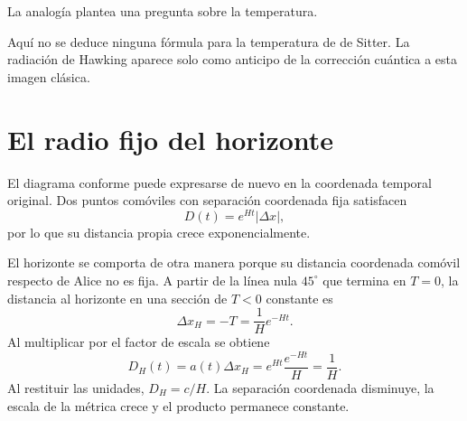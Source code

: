 La analogía plantea una pregunta sobre la temperatura.

\begin{classroomqa}
\end{classroomqa}

Aquí no se deduce ninguna fórmula para la temperatura de de Sitter. La radiación de Hawking aparece solo como anticipo de la corrección cuántica a esta imagen clásica.

\section{El radio fijo del horizonte}

El diagrama conforme puede expresarse de nuevo en la coordenada temporal original. Dos puntos comóviles con separación coordenada fija satisfacen
\begin{equation}
D(t)=e^{Ht}\lvert\Delta x\rvert,
\end{equation}
por lo que su distancia propia crece exponencialmente.

\begin{classroomqa}
\end{classroomqa}

El horizonte se comporta de otra manera porque su distancia coordenada comóvil respecto de Alice no es fija. A partir de la línea nula \(45^\circ\) que termina en \(T=0\), la distancia al horizonte en una sección de \(T<0\) constante es
\begin{equation}
\Delta x_H=-T=\frac{1}{H}e^{-Ht}.
\label{eq:l08-coordinate-horizon}
\end{equation}
Al multiplicar por el factor de escala se obtiene
\begin{equation}
D_H(t)=a(t)\Delta x_H
=e^{Ht}\frac{e^{-Ht}}{H}
=\frac{1}{H}.
\label{eq:l08-fixed-horizon}
\end{equation}
Al restituir las unidades, \(D_H=c/H\). La separación coordenada disminuye, la escala de la métrica crece y el producto permanece constante.

